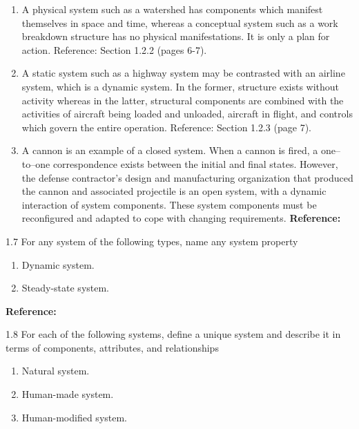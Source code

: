 \begin{exsol@solution}{}
        \begin{enumerate}[label=\alph*)]
            \item A physical system such as a watershed has components which manifest themselves in space and time, whereas a conceptual system such as a work breakdown structure has no physical manifestations. It is only a plan for action. Reference: Section 1.2.2 (pages 6-7).
            \item A static system such as a highway system may be contrasted with an airline system, which is a dynamic system. In the former, structure exists without activity whereas in the latter, structural components are combined with the activities of aircraft being loaded and unloaded, aircraft in flight, and controls which govern the entire operation. Reference: Section 1.2.3 (page 7).
            \item A cannon is an example of a closed system. When a cannon is fired, a one–to–one correspondence exists between the initial and final states. However, the defense contractor’s design and manufacturing organization that produced the cannon and associated projectile is an open system, with a dynamic interaction of system components. These system components must be reconfigured and adapted to cope with changing requirements. \textbf{Reference:}
        \end{enumerate}
\end{exsol@solution}
\begin{exsol@exercise}{1.7}
    \label{sea-1-15}
        For any system of the following types, name any system property
        \begin{enumerate}[label=\alph*)]
            \item Dynamic system.
            \item Steady-state system.
        \end{enumerate}
\end{exsol@exercise}
\begin{exsol@solution}{}
        \textbf{Reference:}
\end{exsol@solution}
\begin{exsol@exercise}{1.8}
    \label{sea-1-9}
        For each of the following systems, define a unique system and describe it in terms of components, attributes, and relationships
        \begin{enumerate}[label=\alph*)]
            \item Natural system.
            \item Human-made system.
            \item Human-modified system.
        \end{enumerate}
\end{exsol@exercise}
